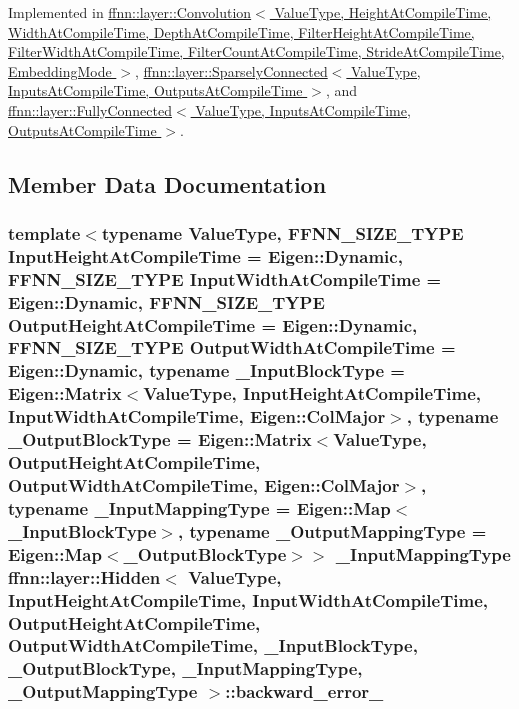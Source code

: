 Implemented in \hyperlink{classffnn_1_1layer_1_1_convolution_ad0e91ef030bfa825af0aa0a5ab54ec57}{ffnn\-::layer\-::\-Convolution$<$ Value\-Type, Height\-At\-Compile\-Time, Width\-At\-Compile\-Time, Depth\-At\-Compile\-Time, Filter\-Height\-At\-Compile\-Time, Filter\-Width\-At\-Compile\-Time, Filter\-Count\-At\-Compile\-Time, Stride\-At\-Compile\-Time, Embedding\-Mode $>$}, \hyperlink{classffnn_1_1layer_1_1_sparsely_connected_afa564d528e74917231da2d038f76e3f1}{ffnn\-::layer\-::\-Sparsely\-Connected$<$ Value\-Type, Inputs\-At\-Compile\-Time, Outputs\-At\-Compile\-Time $>$}, and \hyperlink{classffnn_1_1layer_1_1_fully_connected_a3194dde96feea7d008cc0c27f30cc805}{ffnn\-::layer\-::\-Fully\-Connected$<$ Value\-Type, Inputs\-At\-Compile\-Time, Outputs\-At\-Compile\-Time $>$}.



\subsection{Member Data Documentation}
\hypertarget{classffnn_1_1layer_1_1_hidden_a4d615b2812b0c170e213a0b946d41e91}{
\subsubsection[{backward\-\_\-error\-\_\-}]{\setlength{\rightskip}{0pt plus 5cm}template$<$typename Value\-Type, F\-F\-N\-N\-\_\-\-S\-I\-Z\-E\-\_\-\-T\-Y\-P\-E Input\-Height\-At\-Compile\-Time = Eigen\-::\-Dynamic, F\-F\-N\-N\-\_\-\-S\-I\-Z\-E\-\_\-\-T\-Y\-P\-E Input\-Width\-At\-Compile\-Time = Eigen\-::\-Dynamic, F\-F\-N\-N\-\_\-\-S\-I\-Z\-E\-\_\-\-T\-Y\-P\-E Output\-Height\-At\-Compile\-Time = Eigen\-::\-Dynamic, F\-F\-N\-N\-\_\-\-S\-I\-Z\-E\-\_\-\-T\-Y\-P\-E Output\-Width\-At\-Compile\-Time = Eigen\-::\-Dynamic, typename \-\_\-\-Input\-Block\-Type = Eigen\-::\-Matrix$<$\-Value\-Type, Input\-Height\-At\-Compile\-Time, Input\-Width\-At\-Compile\-Time, Eigen\-::\-Col\-Major$>$, typename \-\_\-\-Output\-Block\-Type = Eigen\-::\-Matrix$<$\-Value\-Type, Output\-Height\-At\-Compile\-Time, Output\-Width\-At\-Compile\-Time, Eigen\-::\-Col\-Major$>$, typename \-\_\-\-Input\-Mapping\-Type = Eigen\-::\-Map$<$\-\_\-\-Input\-Block\-Type$>$, typename \-\_\-\-Output\-Mapping\-Type = Eigen\-::\-Map$<$\-\_\-\-Output\-Block\-Type$>$$>$ \-\_\-\-Input\-Mapping\-Type {\bf ffnn\-::layer\-::\-Hidden}$<$ Value\-Type, Input\-Height\-At\-Compile\-Time, Input\-Width\-At\-Compile\-Time, Output\-Height\-At\-Compile\-Time, Output\-Width\-At\-Compile\-Time, \-\_\-\-Input\-Block\-Type, \-\_\-\-Output\-Block\-Type, \-\_\-\-Input\-Mapping\-Type, \-\_\-\-Output\-Mapping\-Type $>$\-::backward\-\_\-error\-\_\-\hspace{0.3cm}{\ttfamily [protected]}}}\label{classffnn_1_1layer_1_1_hidden_a4d615b2812b0c170e213a0b946d41e91}



